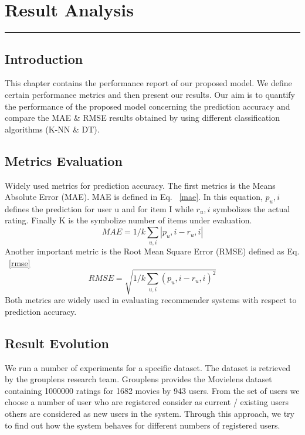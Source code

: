 \documentclass[document.tex]{subfiles}
\begin{document}
	\chapter{Result Analysis}
	\hrule

	\newpage
	\section{Introduction}
	This chapter contains the performance report of our proposed model. We define certain performance metrics and then present our results. Our aim is to quantify the performance of the proposed model concerning the prediction accuracy and compare the MAE \& RMSE results obtained by using different classification algorithms (K-NN \& DT).
	\section{Metrics Evaluation}
	Widely used metrics for prediction accuracy. The first metrics is the Means Absolute Error (MAE). MAE is defined in Eq. ~\ref{mae}. In this equation, $p_u,i$ defines the prediction for user u and for item I while $r_u,i$ symbolizes the actual rating. Finally K is the symbolize number of items under evaluation.
	\begin{equation}
	MAE =1/k \sum_{u,i} |p_u,i - r_u,i|
	\label{mae}	
	\end{equation}  
	Another important metric is the Root Mean Square Error (RMSE) defined as Eq. ~\ref{rmse}
	\begin{equation}
	RMSE =\sqrt{1/k \sum_{u,i} (p_u,i - r_u,i)^2}
	\label{rmse}
	\end{equation}  
	Both metrics are widely used in evaluating recommender systems with respect to prediction accuracy. 
	\section{Result Evolution}
	We run a number of experiments for a specific dataset. The dataset is retrieved by the grouplens research team\cite{a39}. Grouplens provides the Movielens dataset containing 1000000 ratings for 1682 movies by 943 users. From the set of users we choose a number of user who are registered consider as current / existing users others are considered as new users in the system. Through this approach, we try to find out how the system behaves for different numbers of registered users.
\end{document}
